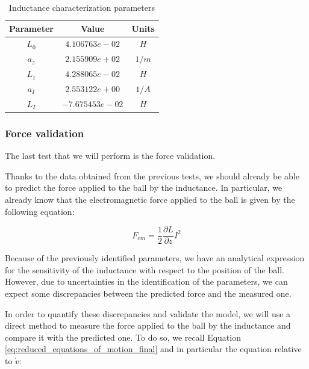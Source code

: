 \begin{table}[H]
    \centering
    \begin{tabular}{|c|c|c|}
        \hline
        \textbf{Parameter} & \textbf{Value}  & \textbf{Units} \\
        \hline
        $L_0$              & $4.106763e-02$  & $H$            \\
        $a_z$              & $2.155909e+02$  & $1/m$          \\
        $L_z$              & $4.288065e-02$  & $H$            \\
        $a_I$              & $2.553122e+00$  & $1/A$          \\
        $L_I$              & $-7.675453e-02$ & $H$            \\
        \hline
    \end{tabular}

    \caption{Inductance characterization parameters}
    \label{tab:inductance_characterization_parameters}

\end{table}

\subsubsection{Force validation}
\label{subsubsec:force_validation}

The last test that we will perform is the force validation.

Thanks to the data obtained from the previous tests, we should already be able to predict the force applied to the ball by the inductance.
In particular, we already know that the electromagnetic force applied to the ball is given by the following equation:

\begin{equation}
    F_{em} = \frac{1}{2} \frac{\partial L}{\partial z} I^2
\end{equation}

Because of the previously identified parameters, we have an analytical expression for the sensitivity of the inductance with respect to the position of the ball.
However, due to uncertainties in the identification of the parameters, we can expect some discrepancies between the predicted force and the measured one.

In order to quantify these discrepancies and validate the model, we will use a direct method to measure the force applied to the ball by the inductance and compare it with the predicted one.
To do so, we recall Equation \ref{eq:reduced_equations_of_motion_final} and in particular the equation relative to $\dot{v}$:

